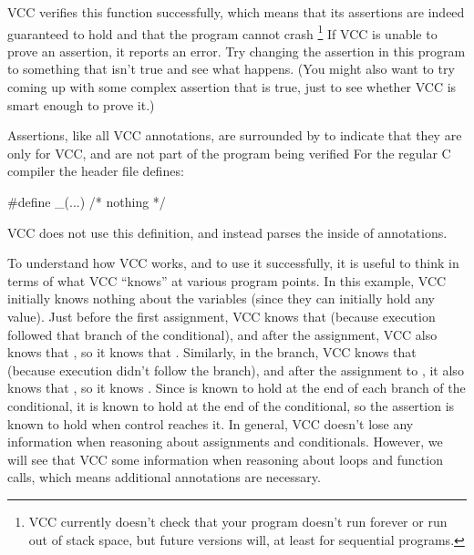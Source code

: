 VCC verifies this function successfully, which means that its
assertions are indeed guaranteed to hold and that the program cannot
crash%
\footnote{
  VCC currently doesn't check that your program doesn't run forever or
  run out of stack space, but future versions will, at least for sequential
  programs.  
}
If VCC is unable
to prove an assertion, it reports an error.  Try changing the
assertion in this program to something that isn't true and see what
happens. (You might also want to try coming up with some complex
assertion that is true, just to see whether VCC is smart enough to
prove it.)

Assertions, like all VCC annotations, 
are surrounded by  to indicate that they are
only for VCC, and are not part of the program being verified
For the regular C compiler the  header file defines:
\begin{VCC}
#define _(...) /* nothing */
\end{VCC}
VCC does not use this definition, and instead parses the inside of 
annotations.%



To understand how VCC works, and to use it successfully, it is useful to
think in terms of what VCC ``knows'' at various program points. In
this example, VCC initially knows nothing about the variables (since they
can initially hold any value). 
Just before the first assignment, VCC knows that 
 (because execution followed that branch of the conditional), and
after the assignment, VCC also knows that , 
so it knows that . Similarly, in the  branch,
VCC knows that  (because execution didn't follow the
 branch), and after the assignment to , it also knows
that , so it knows . Since 
 is known to hold at the end of each branch of the
conditional, it is known to hold at the end of the conditional, so the
assertion is known to hold when control reaches it. In general,
VCC doesn't lose any information when reasoning about assignments and
conditionals. However, we will see that VCC
 some information when reasoning about loops and function calls,
which means additional annotations are necessary.

